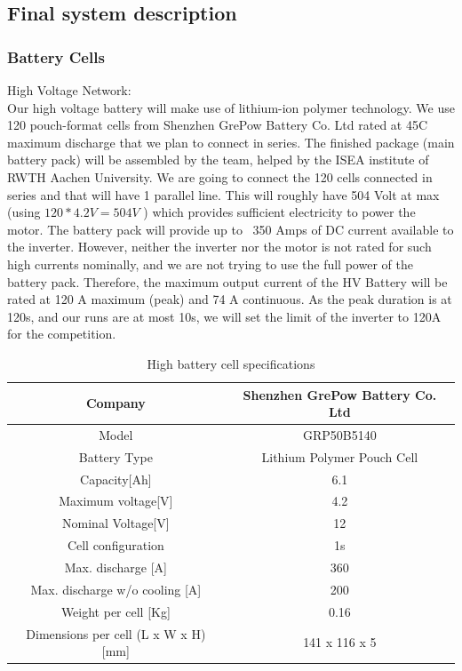 \subsection{Final system description}
\subsubsection{Battery Cells} 

High Voltage Network: \\
Our high voltage battery will make use of lithium-ion polymer technology. We use 120 pouch-format cells from Shenzhen GrePow Battery Co. Ltd rated at 45C maximum discharge that we plan to connect in series. 
The finished package (main battery pack) will be assembled by the team, helped by the ISEA institute of RWTH Aachen University.
We are going to connect the 120 cells connected in series and that will have 1 parallel line. This will roughly have 504 Volt at max (using \(120 * 4.2V = 504 V \) ) 
which provides sufficient electricity to power the motor.
The battery pack will provide up to ~350 Amps of DC current available to the inverter. However, neither the inverter nor the motor is not rated for such high currents nominally, and we are not trying to use the full power of the battery pack.
\newline
Therefore, the maximum output current of the HV Battery will be rated at 120 A maximum (peak) and 74 A continuous. As the peak duration is at 120s, and our runs are at most 10s, we will set the limit of the inverter to 120A for the competition.

\begin{table}[h]
    \centering
    \begin{tabular}{|c|c|}
       \hline
       Company & Shenzhen GrePow Battery Co. Ltd\\
         \hline
        Model & GRP50B5140\\
       Battery Type & Lithium Polymer Pouch Cell\\
       \hline
       Capacity[Ah] & 6.1 \\
       \hline
       Maximum voltage[V] & 4.2 \\
       \hline
       Nominal Voltage[V] & 12 \\
       \hline
       Cell configuration & 1s \\
       \hline
       Max. discharge [A] & 360 \\
       \hline
       Max. discharge w/o cooling [A] & 200 \\
       Weight per cell [Kg] & 0.16 \\
       \hline 
       Dimensions per cell (L x W x H)[mm] & 141 x 116 x 5 \\
       \hline 
    \end{tabular}
    \label{High Voltage Cell Specs}
    \caption{High battery cell specifications}
\end{table}    

